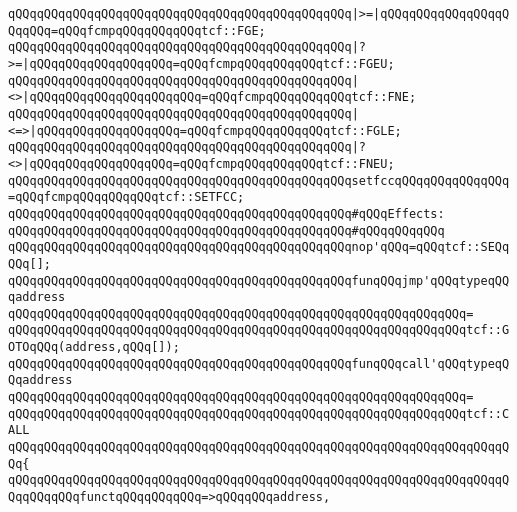\verb|qQQqqQQqqQQqqQQqqQQqqQQqqQQqqQQqqQQqqQQqqQQqqQQq|\verb#|>=|qQQqqQQqqQQqqQQqqQQqqQQq=qQQqfcmpqQQqqQQqqQQqtcf::FGE;#\newline
\verb|qQQqqQQqqQQqqQQqqQQqqQQqqQQqqQQqqQQqqQQqqQQqqQQq|\verb#|?>=|qQQqqQQqqQQqqQQqqQQq=qQQqfcmpqQQqqQQqqQQqtcf::FGEU;#\newline
\verb|qQQqqQQqqQQqqQQqqQQqqQQqqQQqqQQqqQQqqQQqqQQqqQQq|\verb#|<>|qQQqqQQqqQQqqQQqqQQqqQQq=qQQqfcmpqQQqqQQqqQQqtcf::FNE;#\newline
\verb|qQQqqQQqqQQqqQQqqQQqqQQqqQQqqQQqqQQqqQQqqQQqqQQq|\verb#|<=>|qQQqqQQqqQQqqQQqqQQq=qQQqfcmpqQQqqQQqqQQqtcf::FGLE;#\newline
\verb|qQQqqQQqqQQqqQQqqQQqqQQqqQQqqQQqqQQqqQQqqQQqqQQq|\verb#|?<>|qQQqqQQqqQQqqQQqqQQq=qQQqfcmpqQQqqQQqqQQqtcf::FNEU;#\newline
\verb|qQQqqQQqqQQqqQQqqQQqqQQqqQQqqQQqqQQqqQQqqQQqqQQqsetfccqQQqqQQqqQQqqQQq=qQQqfcmpqQQqqQQqqQQqtcf::SETFCC;|\newline
\newline
\verb|qQQqqQQqqQQqqQQqqQQqqQQqqQQqqQQqqQQqqQQqqQQqqQQq#qQQqEffects:|\newline
\verb|qQQqqQQqqQQqqQQqqQQqqQQqqQQqqQQqqQQqqQQqqQQqqQQq#qQQqqQQqqQQq|\newline
\verb|qQQqqQQqqQQqqQQqqQQqqQQqqQQqqQQqqQQqqQQqqQQqqQQqnop'qQQq=qQQqtcf::SEQqQQq[];|\newline
\newline
\verb|qQQqqQQqqQQqqQQqqQQqqQQqqQQqqQQqqQQqqQQqqQQqqQQqfunqQQqjmp'qQQqtypeqQQqaddress|\newline
\verb|qQQqqQQqqQQqqQQqqQQqqQQqqQQqqQQqqQQqqQQqqQQqqQQqqQQqqQQqqQQqqQQq=|\newline
\verb|qQQqqQQqqQQqqQQqqQQqqQQqqQQqqQQqqQQqqQQqqQQqqQQqqQQqqQQqqQQqqQQqtcf::GOTOqQQq(address,qQQq[]);|\newline
\newline
\verb|qQQqqQQqqQQqqQQqqQQqqQQqqQQqqQQqqQQqqQQqqQQqqQQqfunqQQqcall'qQQqtypeqQQqaddress|\newline
\verb|qQQqqQQqqQQqqQQqqQQqqQQqqQQqqQQqqQQqqQQqqQQqqQQqqQQqqQQqqQQqqQQq=|\newline
\verb|qQQqqQQqqQQqqQQqqQQqqQQqqQQqqQQqqQQqqQQqqQQqqQQqqQQqqQQqqQQqqQQqtcf::CALL|\newline
\verb|qQQqqQQqqQQqqQQqqQQqqQQqqQQqqQQqqQQqqQQqqQQqqQQqqQQqqQQqqQQqqQQqqQQqqQQq{|\newline
\verb|qQQqqQQqqQQqqQQqqQQqqQQqqQQqqQQqqQQqqQQqqQQqqQQqqQQqqQQqqQQqqQQqqQQqqQQqqQQqqQQqfunctqQQqqQQqqQQq=>qQQqqQQqaddress,|\newline
